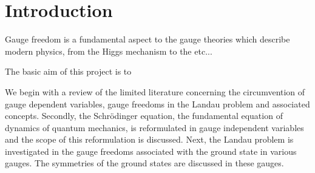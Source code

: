 \section{Introduction}
\label{sec:introduction}

Gauge freedom is a fundamental aspect to the gauge theories which describe
modern physics, from the Higgs mechanism\cite{higgs-1964} to the etc...

The basic aim of this project is to 

We begin with a review of the limited literature concerning the circumvention of
gauge dependent variables, gauge freedoms in the Landau problem and associated
concepts. Secondly, the Schr\"odinger equation, the fundamental equation of dynamics
of quantum mechanics, is reformulated in gauge independent variables and the
scope of this reformulation is discussed. Next, the Landau problem is
investigated in the gauge freedoms associated with the ground state in various
gauges. The symmetries of the ground states are discussed in these gauges.
